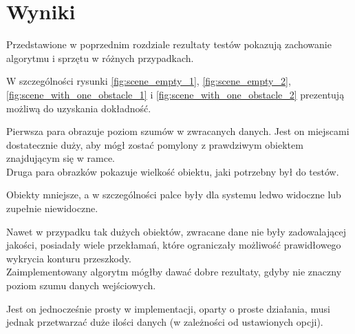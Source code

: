 \chapter{Wyniki}\label{ch:results}

Przedstawione w poprzednim rozdziale rezultaty testów pokazują zachowanie algorytmu i sprzętu w różnych przypadkach.

W szczególności rysunki \ref{fig:scene_empty_1}, \ref{fig:scene_empty_2}, \ref{fig:scene_with_one_obstacle_1} i \ref{fig:scene_with_one_obstacle_2} prezentują możliwą do uzyskania dokładność.

Pierwsza para obrazuje poziom szumów w zwracanych danych.
Jest on miejscami dostatecznie duży, aby mógł zostać pomylony z prawdziwym obiektem znajdującym się w ramce.\\

Druga para obrazków pokazuje wielkość obiektu, jaki potrzebny był do testów.

Obiekty mniejsze, a w szczególności palce były dla systemu ledwo widoczne lub zupełnie niewidoczne.

Nawet w przypadku tak dużych obiektów, zwracane dane nie były zadowalającej jakości, posiadały wiele przekłamań, które ograniczały możliwość prawidłowego wykrycia konturu przeszkody.\\

Zaimplementowany algorytm mógłby dawać dobre rezultaty, gdyby nie znaczny poziom szumu danych wejściowych.

Jest on jednocześnie prosty w implementacji, oparty o proste działania, musi jednak przetwarzać duże ilości danych (w zależności od ustawionych opcji).
